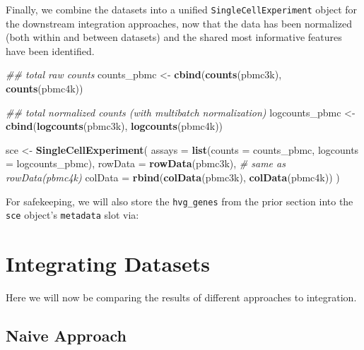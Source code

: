 \documentclass[]{book}
\newenvironment{Shaded}{\begin{snugshade}}{\end{snugshade}}
\newcommand{\CommentTok}[1]{\textcolor[rgb]{0.56,0.35,0.01}{\textit{#1}}}
\newcommand{\DataTypeTok}[1]{\textcolor[rgb]{0.13,0.29,0.53}{#1}}
\newcommand{\KeywordTok}[1]{\textcolor[rgb]{0.13,0.29,0.53}{\textbf{#1}}}
\newcommand{\NormalTok}[1]{#1}
\newcommand{\OperatorTok}[1]{\textcolor[rgb]{0.81,0.36,0.00}{\textbf{#1}}}
\newcommand{\StringTok}[1]{\textcolor[rgb]{0.31,0.60,0.02}{#1}}
\begin{document}
Finally, we combine the datasets into a unified \texttt{SingleCellExperiment} object for the downstream integration approaches, now that the data has been normalized (both within and between datasets) and the shared most informative features have been identified.

\begin{Shaded}
\begin{Highlighting}[]
\CommentTok{## total raw counts}
\NormalTok{counts_pbmc <-}\StringTok{ }\KeywordTok{cbind}\NormalTok{(}\KeywordTok{counts}\NormalTok{(pbmc3k), }\KeywordTok{counts}\NormalTok{(pbmc4k))}

\CommentTok{## total normalized counts (with multibatch normalization)}
\NormalTok{logcounts_pbmc <-}\StringTok{ }\KeywordTok{cbind}\NormalTok{(}\KeywordTok{logcounts}\NormalTok{(pbmc3k), }\KeywordTok{logcounts}\NormalTok{(pbmc4k))}

\NormalTok{sce <-}\StringTok{ }\KeywordTok{SingleCellExperiment}\NormalTok{( }
    \DataTypeTok{assays =} \KeywordTok{list}\NormalTok{(}\DataTypeTok{counts =}\NormalTok{ counts_pbmc, }\DataTypeTok{logcounts =}\NormalTok{ logcounts_pbmc),  }
    \DataTypeTok{rowData =} \KeywordTok{rowData}\NormalTok{(pbmc3k), }\CommentTok{# same as rowData(pbmc4k) }
    \DataTypeTok{colData =} \KeywordTok{rbind}\NormalTok{(}\KeywordTok{colData}\NormalTok{(pbmc3k), }\KeywordTok{colData}\NormalTok{(pbmc4k)) }
\NormalTok{)}
\end{Highlighting}
\end{Shaded}

For safekeeping, we will also store the \texttt{hvg\_genes} from the prior section into the \texttt{sce} object's \texttt{metadata} slot via:

\begin{Shaded}
\end{Shaded}

\hypertarget{integrating-datasets-1}{%
\section{Integrating Datasets}\label{integrating-datasets-1}}

Here we will now be comparing the results of different approaches to integration.

\hypertarget{naive-approach}{%
\subsection{Naive Approach}\label{naive-approach}}
\end{document}
